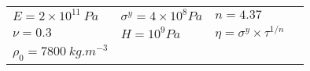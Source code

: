   \begin{tabular}{l|l|lN}
    \hline
    $E=2\times 10^{11}\:Pa$ & $\sigma^y=4 \times 10^8 Pa$ & $n=4.37$&  \\ [3pt]
    $\nu=0.3$ & $H=10^{9} Pa$ & $\eta=\sigma^y \times \tau^{1/n} $ & \\[3pt]
    $\rho_0 = 7800 \: kg.m^{-3}$ & & &\\[3pt]
    \hline
  \end{tabular}

